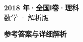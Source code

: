 \documentclass[zihao=-4, a4paper]{ctexart}
\begin{document}
\begin{center}
  {\Large\bfseries 2018 年·全国Ⅰ卷·理科}\\[4pt]
  {\large 数学 · 解析版}
\end{center}
\medskip
{}

\clearpage
{}
\begin{center}{\Large\bfseries 参考答案与详细解析}\end{center}
\medskip

\end{document}
